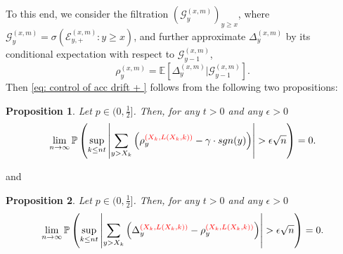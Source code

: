 \documentclass[twoside,12pt,a4paper]{article}
\newtheorem{proposition}{Proposition}[section]
\numberwithin{equation}{section}
\newcommand{\abs}[1]{\left\vert #1 \right\vert}
\newcommand{\edt}[1]{\textcolor{red}{#1}} %
\begin{document}
	To this end, we consider the filtration $\left(\mathcal{G}_{y}^{(x,m)}\right)_{y\geq x}$, where $ \mathcal{G}_{y}^{(x,m)} = \sigma\left( \mathcal{E}^{(x,m)}_{y,+} : y \geq x \right)$, and further approximate $\Delta_y^{(x,m)}$ by its conditional expectation with respect to $\mathcal{G}_{y-1}^{(x,m)}$,
	\begin{equation}\label{eq: conditional mean}
		\rho_{y}^{(x,m)}= \mathbb{E}\left[\Delta_y^{(x,m)} | \mathcal{G}_{y-1}^{(x,m)}\right].
	\end{equation}
	Then \eqref{eq: control of acc drift + } follows from the following two propositions:
	\begin{proposition}\label{lm: approximation of means of local drift}
		Let $p\in (0,\frac{1}{2}]$. Then, for any $t>0$ and any $\epsilon >0$
		\begin{equation}\label{eq: control of expected local drift}
			\lim_{n \to \infty }\mathbb{P}\left(\sup_{k\leq nt} \abs{\sum_{y> X_k} \left( \rho_{y}^{\edt{(X_k,L(X_k,k))}} - \gamma  \cdot sgn(y) \right)   }  > \epsilon \sqrt{n}  \right) =0. 
		\end{equation}
	\end{proposition}
	and
	\begin{proposition}\label{lm: approx local drift by conditional means}
		Let $p\in (0,\frac{1}{2}]$. Then, for any $t>0$ and any $\epsilon >0$
		\begin{equation}\label{eq: control of martingale difference for local drift}
			\lim_{n \to \infty }\mathbb{P}\left(\sup_{k\leq nt} \abs{\sum_{y> X_k} \left(\Delta_{y}^{\edt{(X_k,L(X_k,k))}}- \rho_{y}^{\edt{(X_k,L(X_k,k))}} \right)   }  > \epsilon \sqrt{n}  \right) =0. 
		\end{equation}
	\end{proposition}

\end{document}
